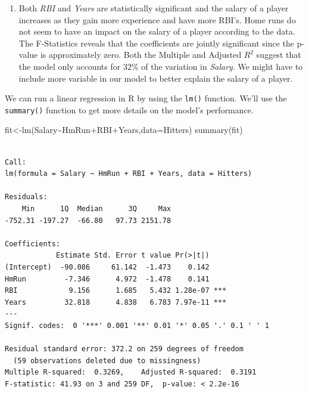 \documentclass[
  letterpaper,
  DIV=11,
  numbers=noendperiod]{scrreprt}
\newenvironment{Shaded}{\begin{snugshade}}{\end{snugshade}}
\newcommand{\AttributeTok}[1]{\textcolor[rgb]{0.40,0.45,0.13}{#1}}
\newcommand{\FunctionTok}[1]{\textcolor[rgb]{0.28,0.35,0.67}{#1}}
\newcommand{\NormalTok}[1]{\textcolor[rgb]{0.00,0.23,0.31}{#1}}
\newcommand{\OtherTok}[1]{\textcolor[rgb]{0.00,0.23,0.31}{#1}}
\newcommand{\SpecialCharTok}[1]{\textcolor[rgb]{0.37,0.37,0.37}{#1}}
\providecommand{\tightlist}{%
  \setlength{\itemsep}{0pt}\setlength{\parskip}{0pt}}\usepackage{longtable,booktabs,array}
\begin{document}
\begin{blackbox}

\begin{enumerate}
\def\labelenumi{\arabic{enumi}.}
\tightlist
\item
  Both \emph{RBI} and \emph{Years} are statistically significant and the
  salary of a player increases as they gain more experience and have
  more RBI's. Home runs do not seem to have an impact on the salary of a
  player according to the data. The F-Statistics reveals that the
  coefficients are jointly significant since the p-value is
  approximately zero. Both the Multiple and Adjusted \(R^2\) suggest
  that the model only accounts for \(32\)\% of the variation in
  \emph{Salary}. We might have to include more variable in our model to
  better explain the salary of a player.
\end{enumerate}

\end{blackbox}

We can run a linear regression in R by using the \texttt{lm()} function.
We'll use the \texttt{summary()} function to get more details on the
model's performance.

\begin{Shaded}
\begin{Highlighting}[numbers=left,,]
\NormalTok{fit}\OtherTok{\textless{}{-}}\FunctionTok{lm}\NormalTok{(Salary}\SpecialCharTok{\textasciitilde{}}\NormalTok{HmRun}\SpecialCharTok{+}\NormalTok{RBI}\SpecialCharTok{+}\NormalTok{Years,}\AttributeTok{data=}\NormalTok{Hitters)}
\FunctionTok{summary}\NormalTok{(fit)}
\end{Highlighting}
\end{Shaded}

\begin{verbatim}

Call:
lm(formula = Salary ~ HmRun + RBI + Years, data = Hitters)

Residuals:
    Min      1Q  Median      3Q     Max 
-752.31 -197.27  -66.80   97.73 2151.78 

Coefficients:
            Estimate Std. Error t value Pr(>|t|)    
(Intercept)  -90.086     61.142  -1.473    0.142    
HmRun         -7.346      4.972  -1.478    0.141    
RBI            9.156      1.685   5.432 1.28e-07 ***
Years         32.818      4.838   6.783 7.97e-11 ***
---
Signif. codes:  0 '***' 0.001 '**' 0.01 '*' 0.05 '.' 0.1 ' ' 1

Residual standard error: 372.2 on 259 degrees of freedom
  (59 observations deleted due to missingness)
Multiple R-squared:  0.3269,    Adjusted R-squared:  0.3191 
F-statistic: 41.93 on 3 and 259 DF,  p-value: < 2.2e-16
\end{verbatim}
\end{document}
